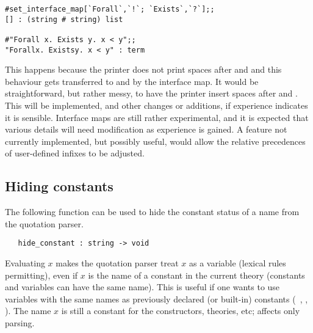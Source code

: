 \setcounter{sessioncount}{1}
\begin{session}\begin{verbatim}
#set_interface_map[`Forall`,`!`; `Exists`,`?`];;
[] : (string # string) list

#"Forall x. Exists y. x < y";;
"Forallx. Existsy. x < y" : term
\end{verbatim}\end{session}

\noindent This happens because the printer does not print spaces after
\ml{!} and  and this behaviour gets transferred to  and
 by the interface map.
It would be straightforward, but rather messy, to have the printer insert
spaces after  and . This will be implemented, and other
changes or additions, if experience indicates it is sensible.
Interface maps are still rather
experimental, and it is expected that various details will need
modification as experience is gained. A feature
not currently implemented, but possibly useful, would
allow the relative precedences of user-defined infixes to be adjusted.

\subsection{Hiding constants}
\label{hidden}

The following function can be used to hide the constant  status of  a name from
the quotation parser.

\begin{boxed}
\begin{verbatim}
   hide_constant : string -> void
\end{verbatim}\end{boxed}


\noindent Evaluating $x$
makes the quotation parser treat $x$ as a variable (lexical
rules permitting), even if $x$ is the name of a constant in the current theory
(constants and variables can have the same name).
This is useful if one wants to use variables  with the same names
as previously declared (or built-in) constants (\eg\ , , 
\etc).
The name $x$ is still a
constant for the constructors, theories, etc; 
affects only  parsing.

